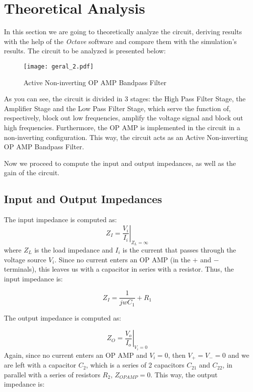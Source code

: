 \section{Theoretical Analysis}
\label{sec:theoretical}

In this section we are going to theoretically analyze the circuit, deriving results with the help of the \textit{Octave} software and compare them with the simulation's results.
The circuit to be analyzed is presented below:

\begin{figure}[H]
\centering
  \texttt{[image: geral\_2.pdf]}
  \caption{Active Non-inverting OP AMP Bandpass Filter}
  \label{fig:geral2}
\end{figure}

As you can see, the circuit is divided in 3 stages: the High Pass Filter Stage, the Amplifier Stage and the Low Pass Filter Stage, which serve the function of, respectively, block out low frequencies, amplify the voltage signal and block out high frequencies.
Furthermore, the OP AMP is implemented in the circuit in a non-inverting configuration. This way, the circuit acts as an Active Non-inverting OP AMP Bandpass Filter.\par
Now we proceed to compute the input and output impedances, as well as the gain of the circuit.

\subsection{Input and Output Impedances}

The input impedance is computed as:
\begin{equation}
Z_{I}=\left.\frac{V_{i}}{I_{i}}\right\vert_{Z_L=\infty}
\end{equation}
where $Z_{L}$ is the load impedance and $I_i$ is the current that passes through the voltage source $V_i$. Since no current enters an OP AMP (in the $+$ and $-$ terminals), this leaves us with a capacitor in series with a resistor.
Thus, the input impedance is:

\begin{equation}
Z_{I}=\frac{1}{jwC_1}+R_1
\end{equation}

The output impedance is computed as:

\begin{equation}
Z_{O}=\left.\frac{V_{o}}{I_{o}}\right\vert_{V_i=0}
\end{equation}
Again, since no current enters an OP AMP and $V_i=0$, then $V_{+}=V_{-}=0$  and we are left with a capacitor $C_2$, which is a series of 2 capacitors $C_{21}$ and $C_{22}$, in parallel with a series of resistors $R_2$, $Z_{OPAMP}=0$.
This way, the output impedance is:


